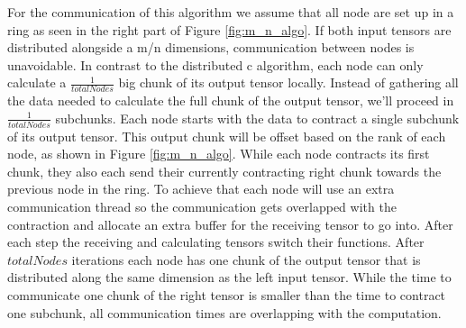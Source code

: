 For the communication of this algorithm we assume that all node are set up in a ring as seen in the right part of Figure \ref{fig:m_n_algo}.
If both input tensors are distributed alongside a m/n dimensions, communication between nodes is unavoidable. %
In contrast to the distributed c algorithm, each node can only calculate a $\frac{1}{totalNodes}$ big chunk of its output tensor locally. %
Instead of gathering all the data needed to calculate the full chunk of the output tensor, we'll proceed in $\frac{1}{totalNodes}$ subchunks. %
Each node starts with the data to contract a single subchunk of its output tensor.
This output chunk will be offset based on the rank of each node, as shown in Figure \ref{fig:m_n_algo}.
While each node contracts its first chunk, they also each send their currently contracting right chunk towards the previous node in the ring.
To achieve that each node will use an extra communication thread so the communication gets overlapped with the contraction and allocate an extra buffer for the receiving tensor to go into.
After each step the receiving and calculating tensors switch their functions.
After $totalNodes$ iterations each node has one chunk of the output tensor that is distributed along the same dimension as the left input tensor.
While the time to communicate one chunk of the right tensor is smaller than the time to contract one subchunk, all communication times are overlapping with the computation.

